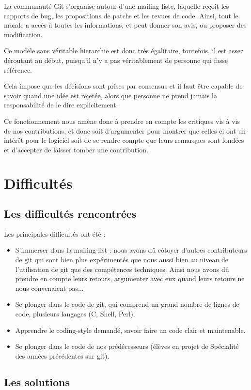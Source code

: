 \documentclass[a4paper, 12pt]{article}
\begin{document}
La communauté Git s'organise autour d'une mailing liste, laquelle reçoit les rapports de bug, les propositions de patchs et les revues de code. Ainsi, tout le monde a accès à toutes les informations, et peut donner son avis, ou proposer des modification.

Ce modèle sans véritable hierarchie est donc très égalitaire, toutefois, il est assez déroutant au début, puisqu'il n'y a pas véritablement de personne qui fasse référence.

Cela impose que les décisions sont prises par consensus et il faut être capable de savoir quand une idée est rejetée, alors que personne ne prend jamais la responsabilité de le dire explicitement.

Ce fonctionnement nous amène donc à prendre en compte les critiques vis à vis de nos contributions, et donc soit d'argumenter pour montrer que celles ci ont un intérêt pour le logiciel soit de se rendre compte que leurs remarques sont fondées et d'accepter de laisser tomber une contribution.

\section{Difficultés}

\subsection{Les difficultés rencontrées}

Les principales difficultés ont été :
\begin{itemize}
\item S'immerser dans la mailing-list : nous avons dû côtoyer d'autres contributeurs de git qui sont bien plus expérimentés que nous aussi bien au niveau de l'utilisation de git que des compétences techniques. Ainsi nous avons dû prendre en compte leurs retours, argumenter avec eux quand leurs retours ne nous convenaient pas...
\item Se plonger dans le code de git, qui comprend un grand nombre de lignes de code, plusieurs langages (C, Shell, Perl).
\item Apprendre le coding-style demandé, savoir faire un code clair et maintenable.
\item Se plonger dans le code de nos prédécesseurs (élèves en projet de Spécialité des années précédentes sur git).
\end{itemize}

\subsection{Les solutions}
\end{document}
